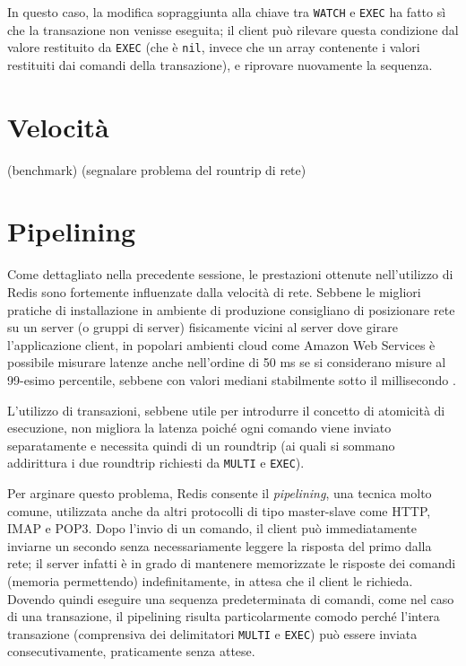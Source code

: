 In questo caso, la modifica sopraggiunta alla chiave tra \verb|WATCH| e \verb|EXEC| ha fatto sì
che la transazione non venisse eseguita; il client può rilevare questa condizione dal valore 
restituito da \verb|EXEC| (che è \verb|nil|, invece che un array contenente i valori restituiti
dai comandi della transazione), e riprovare nuovamente la sequenza.

\section{Velocit\`a}

(benchmark)
(segnalare problema del rountrip di rete)


\section{Pipelining}

Come dettagliato nella precedente sessione, le prestazioni ottenute nell'utilizzo di Redis sono
fortemente influenzate dalla velocità di rete. Sebbene le migliori pratiche di installazione in
ambiente di produzione consigliano di posizionare rete su un server (o gruppi di server) fisicamente
vicini al server dove girare l'applicazione client, in popolari ambienti cloud come Amazon Web
Services è possibile misurare latenze anche nell'ordine di 50 ms se si considerano misure al
99-esimo percentile, sebbene con valori mediani stabilmente sotto il millisecondo
\cite{aws-latency}.

L'utilizzo di transazioni, sebbene utile per introdurre il concetto di atomicità di esecuzione,
non migliora la latenza poiché ogni comando viene inviato separatamente e necessita quindi di un 
roundtrip (ai quali si sommano addirittura i due roundtrip richiesti da \verb|MULTI| e \verb|EXEC|).

Per arginare questo problema, Redis consente il \emph{pipelining}, una tecnica molto comune, 
utilizzata anche da altri protocolli di tipo master-slave come HTTP, IMAP e POP3. Dopo l'invio 
di un comando, il client può immediatamente inviarne un secondo senza necessariamente leggere
la risposta del primo dalla rete; il server infatti è in grado di mantenere memorizzate le risposte
dei comandi (memoria permettendo) indefinitamente, in attesa che il client le richieda. Dovendo
quindi eseguire una sequenza predeterminata di comandi, come nel caso di una transazione, il
pipelining risulta particolarmente comodo perché l'intera transazione (comprensiva dei delimitatori
\verb|MULTI| e \verb|EXEC|) può essere inviata consecutivamente, praticamente senza attese.

